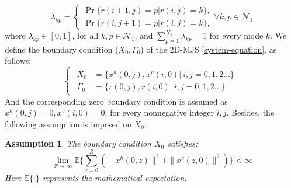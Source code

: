 \documentclass[journal,final,twocolumn]{IEEEtran}
\newtheorem{remark}{Remark}
\newtheorem{assumption}{Assumption}
\begin{document}
	\begin{equation}\label{tps_system}
	\lambda_{kp}=
	\begin{cases}
	\Pr\{r(i+1,j)=p|r(i,j)=k\},\\
	\Pr\{r(i,j+1)=p|r(i,j)=k\}, 
	\end{cases} \forall k,p \in \mathcal{N}_{1}
	\end{equation}
	where $\lambda_{kp}\in[0,1]$, for all $k, p\in\mathcal{N}_{1}$, and $\sum_{p=1}^{N_1}\lambda_{kp}=1$ for every mode $k$.
	We define the boundary condition ($X_{0},\varGamma_{0}$) of the 2D-MJS \eqref{system-equation}, as follows:
	\begin{equation} \label{boundary-condition}
	\left\{
		\begin{array}{lr}
			\begin{split}
				X_{0} &= \{x^{h}(0,j),x^{v}(i,0)|\ i,j = 0,1,2...\}\\
				\varGamma_{0} &= \{r(0,j), r(i,0)|\ i,j = 0,1,2... \}
			\end{split}
		\end{array}
	\right.
	\end{equation}
	And the corresponding zero boundary condition is assumed as $x^{h}(0,j) =0, x^{v}(i,0)=0$, for every nonnegative integer $i,j$. Besides, the following assumption is imposed on $X_{0}$:
	
	\begin{assumption}\label{boundary-assumptin}
	 	The boundary condition $X_{0}$ satisfies:
	 	\begin{equation}
	 		\lim\limits_{Z\to\infty}\mathbb{E}\Big\{\sum_{z=0}^{Z}(\|x^{h}(0,z)\|^{2}+ \|x^{v}(z,0)\|^{2})\Big\} < \infty
	 	\end{equation}
	 	Here $\mathbb{E}\{\cdot\}$ represents the mathematical expectation.
	\end{assumption}
	
\end{document}
